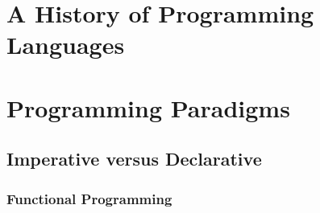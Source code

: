 \toclineskip
\section{A History of Programming Languages}



\toclineskip
\section{Programming Paradigms}



\subsection{Imperative versus Declarative}

\subsubsection{Functional Programming}

